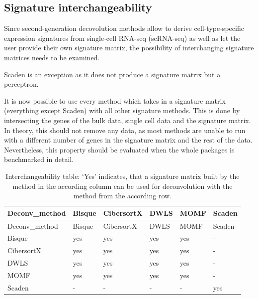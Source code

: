 \documentclass[
]{article}
\begin{document}
\hypertarget{signature-interchangeability}{%
\subsection{Signature
interchangeability}\label{signature-interchangeability}}

Since second-generation decovolution methods allow to derive
cell-type-specific expression signatures from single-cell RNA-seq
(scRNA-seq) as well as let the user provide their own signature matrix,
the possibility of interchanging signature matrices needs to be
examined.

Scaden is an exception as it does not produce a signature matrix but a
perceptron.

It is now possible to use every method which takes in a signature matrix
(everything except Scaden) with all other signature methods. This is
done by intersecting the genes of the bulk data, single cell data and
the signature matrix. In theory, this should not remove any data, as
most methods are unable to run with a different number of genes in the
signature matrix and the rest of the data. Nevertheless, this property
should be evaluated when the whole packages is benchmarked in detail.

\begin{longtable}[]{@{}llllll@{}}
\caption{Interchangeability table: `Yes' indicates, that a signature
matrix built by the method in the according column can be used for
deconvolution with the method from the according row.}\tabularnewline
\toprule
Deconv\_method & Bisque & CibersortX & DWLS & MOMF &
Scaden\tabularnewline
\midrule
\endfirsthead
\toprule
Deconv\_method & Bisque & CibersortX & DWLS & MOMF &
Scaden\tabularnewline
\midrule
\endhead
Bisque & yes & yes & yes & yes & -\tabularnewline
CibersortX & yes & yes & yes & yes & -\tabularnewline
DWLS & yes & yes & yes & yes & -\tabularnewline
MOMF & yes & yes & yes & yes & -\tabularnewline
Scaden & - & - & - & - & yes\tabularnewline
\bottomrule
\end{longtable}
\end{document}
